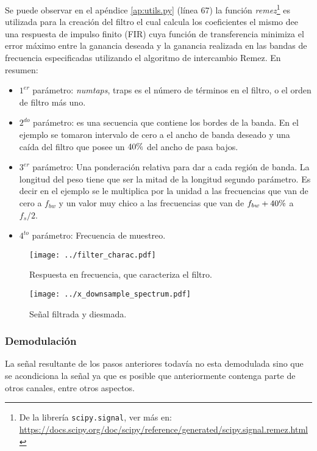 Se puede observar en el apéndice \ref{ap:utils.py} (línea 67) la función \emph{remez}\footnote{De la librería \texttt{scipy.signal}, ver más en: \url{https://docs.scipy.org/doc/scipy/reference/generated/scipy.signal.remez.html}} es utilizada para la creación del filtro el cual calcula los coeficientes el mismo dee una respuesta de impulso finito (FIR) cuya función de transferencia minimiza el error máximo entre la ganancia deseada y la ganancia realizada en las bandas de frecuencia especificadas utilizando el algoritmo de intercambio Remez.
En resumen:
\begin{itemize}
	\item $1^{er}$ parámetro: \emph{numtaps}, traps es el número de términos en el filtro, o el orden de filtro más uno.
	\item $2^{do}$ parámetro: es una secuencia que contiene los bordes de la banda.
	En el ejemplo se tomaron intervalo de cero a el ancho de banda deseado y una caída del filtro que posee un $40\%$ del ancho de pasa bajos. 
	\item $3^{er}$ parámetro: Una ponderación relativa para dar a cada región de banda. La longitud del peso tiene que ser la mitad de la longitud segundo parámetro.
	Es decir en el ejemplo se le multiplica por la unidad a las frecuencias que van de cero a $f_{bw}$ y un valor muy chico a las frecuencias que van de $f_{bw} + 40\%$ a $f_s/2$.
	\item $4^{to}$ parámetro: Frecuencia de muestreo.
\end{itemize}

\begin{figure}[ht!]
	\centering
	\texttt{[image: ../filter\_charac.pdf]}
	\caption{Respuesta en frecuencia, que caracteriza el filtro.}
	\label{fig:filter_charac}
\end{figure}

\begin{figure}[ht!]
	\centering
	\texttt{[image: ../x\_downsample\_spectrum.pdf]}
	\caption{Señal filtrada y diesmada.}
	\label{fig:x_downsample_spectrum}
\end{figure}

\subsubsection{Demodulación}
La señal resultante de los pasos anteriores todavía no esta demodulada sino que se acondiciona la señal ya que es posible que anteriormente contenga parte de otros canales, entre otros aspectos. 

